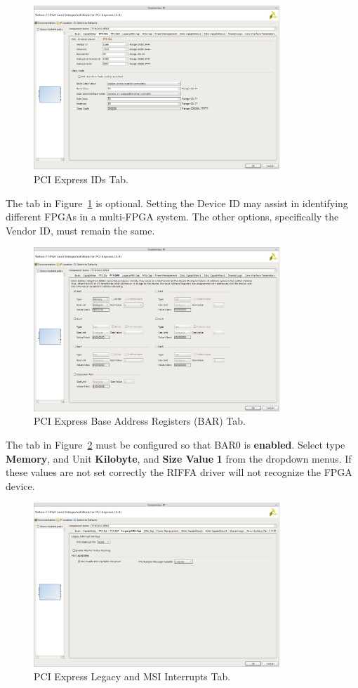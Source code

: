 \documentclass{refrep}
\newcommand{\ConfigSetting}[1]{\textbf{#1}}
\begin{document}
\begin{figure}[H]
  \includegraphics[width=350px,center]{Gen3IntegratedTabPF0Ids.png}
  \caption{PCI Express IDs Tab.}
  \label{Fig:Gen3Integrated:Generating:Gen3IntegratedTabPF0Ids}
\end{figure}
The tab in Figure~\ref{Fig:Gen3Integrated:Generating:Gen3IntegratedTabPF0Ids}
is optional. Setting the Device ID may assist in identifying different FPGAs in
a multi-FPGA system. The other options, specifically the Vendor ID, must remain
the same.
\begin{figure}[H]
  \includegraphics[width=350px,center]{Gen3IntegratedTabPF0Bar.png}
  \caption{PCI Express Base Address Registers (BAR) Tab.}
  \label{Fig:Gen3Integrated:Generating:Gen3IntegratedTabPF0Bar}
\end{figure}
The tab in Figure~\ref{Fig:Gen3Integrated:Generating:Gen3IntegratedTabPF0Bar}
must be configured so that BAR0 is \ConfigSetting{enabled}. Select type
\ConfigSetting{Memory}, and Unit \ConfigSetting{Kilobyte}, and
\ConfigSetting{Size Value} \ConfigSetting{1} from the dropdown menus. If these
values are not set correctly the RIFFA driver will not recognize the FPGA
device.
\begin{figure}[H]
  \includegraphics[width=350px,center]{Gen3IntegratedTabLegacyMSICap.png}
  \caption{PCI Express Legacy and MSI Interrupts Tab.}
  \label{Fig:Gen3Integrated:Generating:Gen3IntegratedTabLegacyMSICap}
\end{figure}
\end{document}
